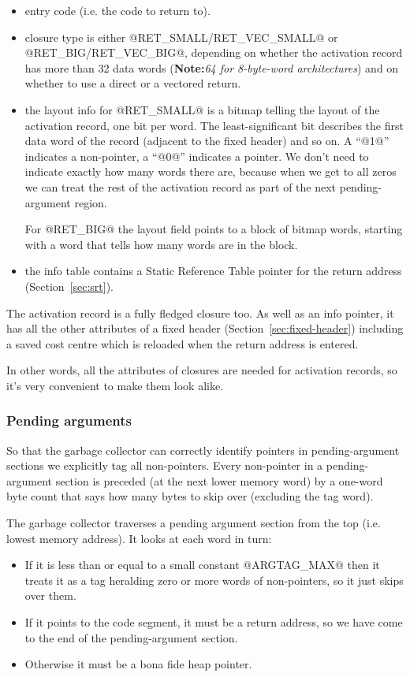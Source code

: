 \documentclass[11pt]{article}
\newcommand{\note}[1]{{{\bf Note:}\sl #1}}
\newcommand{\secref}[1]{Section~\ref{sec:#1}}
\newcommand{\Subsubsection}[2]{\subsubsection{#1}\label{sec:#2}}
\begin{document}
\begin{itemize}
\item entry code (i.e. the code to return to).

\item closure type is either @RET_SMALL/RET_VEC_SMALL@ or
@RET_BIG/RET_VEC_BIG@, depending on whether the activation record has
more than 32 data words (\note{64 for 8-byte-word architectures}) and
on whether to use a direct or a vectored return.

\item the layout info for @RET_SMALL@ is a bitmap telling the layout
of the activation record, one bit per word.  The least-significant bit
describes the first data word of the record (adjacent to the fixed
header) and so on.  A ``@1@'' indicates a non-pointer, a ``@0@''
indicates a pointer.  We don't need to indicate exactly how many words
there are, because when we get to all zeros we can treat the rest of
the activation record as part of the next pending-argument region.

For @RET_BIG@ the layout field points to a block of bitmap words,
starting with a word that tells how many words are in the block.

\item the info table contains a Static Reference Table pointer for the
return address (\secref{srt}).
\end{itemize}

The activation record is a fully fledged closure too.  As well as an
info pointer, it has all the other attributes of a fixed header
(\secref{fixed-header}) including a saved cost centre which
is reloaded when the return address is entered.

In other words, all the attributes of closures are needed for
activation records, so it's very convenient to make them look alike.


\Subsubsection{Pending arguments}{pending-args}

So that the garbage collector can correctly identify pointers in
pending-argument sections we explicitly tag all non-pointers.  Every
non-pointer in a pending-argument section is preceded (at the next
lower memory word) by a one-word byte count that says how many bytes
to skip over (excluding the tag word).

The garbage collector traverses a pending argument section from the
top (i.e. lowest memory address).  It looks at each word in turn:

\begin{itemize}
\item If it is less than or equal to a small constant @ARGTAG_MAX@
then it treats it as a tag heralding zero or more words of
non-pointers, so it just skips over them.

\item If it points to the code segment, it must be a return
address, so we have come to the end of the pending-argument section.

\item Otherwise it must be a bona fide heap pointer.
\end{itemize}
\end{document}
